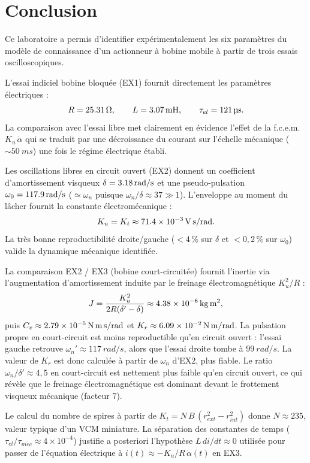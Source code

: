 \section{Conclusion}

Ce laboratoire a permis d'identifier expérimentalement les six paramètres du modèle de connaissance d'un actionneur à bobine mobile à partir de trois essais oscilloscopiques.

L'essai indiciel bobine bloquée (EX1) fournit directement les paramètres électriques :
\[
R = \SI{25{,}31}{\ohm}, \qquad L = \SI{3{,}07}{mH}, \qquad \tau_{el} = \SI{121}{\micro s}.
\]
La comparaison avec l'essai libre met clairement en évidence l'effet de la f.c.e.m.\ \(K_u\,\dot\alpha\) qui se traduit par une décroissance du courant sur l'échelle mécanique (\(\sim\!\SI{50}{ms}\)) une fois le régime électrique établi.

Les oscillations libres en circuit ouvert (EX2) donnent un coefficient d'amortissement visqueux \(\delta = \SI{3{,}18}{rad/s}\) et une pseudo-pulsation \(\omega_0 = \SI{117{,}9}{rad/s}\) (\(\simeq \omega_n\) puisque \(\omega_n/\delta \approx 37 \gg 1\)). L'enveloppe au moment du lâcher fournit la constante électromécanique :
\[
K_u = K_t \approx \SI{71{,}4e-3}{V.s/rad}.
\]
La très bonne reproductibilité droite/gauche (\(<4\,\%\) sur \(\delta\) et \(<0{,}2\,\%\) sur \(\omega_0\)) valide la dynamique mécanique identifiée.

La comparaison EX2 / EX3 (bobine court-circuitée) fournit l'inertie via l'augmentation d'amortissement induite par le freinage électromagnétique \(K_u^2/R\) :
\[
J = \frac{K_u^2}{2R(\delta' - \delta)} \approx \SI{4{,}38e-6}{kg.m^2},
\]
puis \(C_v \approx \SI{2{,}79e-5}{N.m.s/rad}\) et \(K_r \approx \SI{6{,}09e-2}{N.m/rad}\). La pulsation propre en court-circuit est moins reproductible qu'en circuit ouvert : l'essai gauche retrouve \(\omega_n' \approx \SI{117}{rad/s}\), alors que l'essai droite tombe à \(\SI{99}{rad/s}\). La valeur de \(K_r\) est donc calculée à partir de \(\omega_n\) d'EX2, plus fiable. Le ratio \(\omega_n/\delta' \approx 4{,}5\) en court-circuit est nettement plus faible qu'en circuit ouvert, ce qui révèle que le freinage électromagnétique est dominant devant le frottement visqueux mécanique (facteur \(7\)).

Le calcul du nombre de spires à partir de \(K_t = N\,B\,(r_{ext}^2 - r_{int}^2)\) donne \(N \approx 235\), valeur typique d'un VCM miniature. La séparation des constantes de temps (\(\tau_{el}/\tau_{m\acute{e}c} \approx 4\!\times\!10^{-4}\)) justifie a posteriori l'hypothèse \(L\,di/dt \approx 0\) utilisée pour passer de l'équation électrique à \(i(t) \approx -K_u/R\,\dot\alpha(t)\) en EX3.

